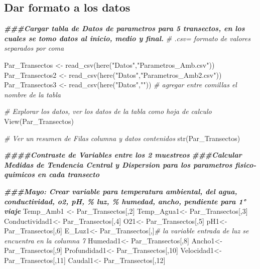 \documentclass[
]{article}
\newenvironment{Shaded}{\begin{snugshade}}{\end{snugshade}}
\newcommand{\CommentTok}[1]{\textcolor[rgb]{0.56,0.35,0.01}{\textit{#1}}}
\newcommand{\DecValTok}[1]{\textcolor[rgb]{0.00,0.00,0.81}{#1}}
\newcommand{\DocumentationTok}[1]{\textcolor[rgb]{0.56,0.35,0.01}{\textbf{\textit{#1}}}}
\newcommand{\FunctionTok}[1]{\textcolor[rgb]{0.00,0.00,0.00}{#1}}
\newcommand{\NormalTok}[1]{#1}
\newcommand{\OtherTok}[1]{\textcolor[rgb]{0.56,0.35,0.01}{#1}}
\newcommand{\StringTok}[1]{\textcolor[rgb]{0.31,0.60,0.02}{#1}}
\begin{document}
\hypertarget{dar-formato-a-los-datos}{%
\subsection{Dar formato a los datos}\label{dar-formato-a-los-datos}}

\begin{Shaded}
\begin{Highlighting}[]
\DocumentationTok{\#\#\#Cargar tabla de Datos de parametros para 5 transectos, en los cuales se tomo datos al inicio, medio y final.  }
\CommentTok{\# .csv= formato de valores separados por coma}

\NormalTok{Par\_Transectos }\OtherTok{\textless{}{-}} \FunctionTok{read\_csv}\NormalTok{(}\FunctionTok{here}\NormalTok{(}\StringTok{"Datos"}\NormalTok{,}\StringTok{"Parametros\_Amb.csv"}\NormalTok{))}
\NormalTok{Par\_Transectos2 }\OtherTok{\textless{}{-}} \FunctionTok{read\_csv}\NormalTok{(}\FunctionTok{here}\NormalTok{(}\StringTok{"Datos"}\NormalTok{,}\StringTok{"Parametros\_Amb2.csv"}\NormalTok{))}
\NormalTok{Par\_Transectos3 }\OtherTok{\textless{}{-}} \FunctionTok{read\_csv}\NormalTok{(}\FunctionTok{here}\NormalTok{(}\StringTok{"Datos"}\NormalTok{,}\StringTok{""}\NormalTok{)) }\CommentTok{\# agregar entre comillas el nombre de la tabla}

\CommentTok{\# Explorar los datos, ver los datos de la tabla como hoja de calculo}
\FunctionTok{View}\NormalTok{(Par\_Transectos)}

\CommentTok{\# Ver un resumen de Filas columna y datos contenidos }
\FunctionTok{str}\NormalTok{(Par\_Transectos)}

\DocumentationTok{\#\#\#\#Contraste de Variables entre los 2 muestreos}
\DocumentationTok{\#\#\#Calcular Medidas de Tendencia Central y Dispersion para los parametros fisico{-}quimicos en cada transecto}

\DocumentationTok{\#\#\#Mayo: Crear variable para temperatura ambiental, del agua, conductividad, o2, pH, \% luz, \% humedad, ancho, pendiente para 1° viaje}
\NormalTok{Temp\_Amb1 }\OtherTok{\textless{}{-}}\NormalTok{ Par\_Transectos[,}\DecValTok{2}\NormalTok{]}
\NormalTok{Temp\_Agua1}\OtherTok{\textless{}{-}}\NormalTok{ Par\_Transectos[,}\DecValTok{3}\NormalTok{]}
\NormalTok{Conductividad1}\OtherTok{\textless{}{-}}\NormalTok{ Par\_Transectos[,}\DecValTok{4}\NormalTok{]}
\NormalTok{O21}\OtherTok{\textless{}{-}}\NormalTok{ Par\_Transectos[,}\DecValTok{5}\NormalTok{]}
\NormalTok{pH1}\OtherTok{\textless{}{-}}\NormalTok{ Par\_Transectos[,}\DecValTok{6}\NormalTok{]}
\NormalTok{E\_Luz1}\OtherTok{\textless{}{-}}\NormalTok{ Par\_Transectos[,]}\CommentTok{\# la variable entrada de luz se encuentra en la columna 7}
\NormalTok{Humedad1}\OtherTok{\textless{}{-}}\NormalTok{ Par\_Transectos[,}\DecValTok{8}\NormalTok{]}
\NormalTok{Ancho1}\OtherTok{\textless{}{-}}\NormalTok{ Par\_Transectos[,}\DecValTok{9}\NormalTok{]}
\NormalTok{Profundidad1}\OtherTok{\textless{}{-}}\NormalTok{ Par\_Transectos[,}\DecValTok{10}\NormalTok{]}
\NormalTok{Velocidad1}\OtherTok{\textless{}{-}}\NormalTok{ Par\_Transectos[,}\DecValTok{11}\NormalTok{]}
\NormalTok{Caudal1}\OtherTok{\textless{}{-}}\NormalTok{ Par\_Transectos[,}\DecValTok{12}\NormalTok{]}


\end{Highlighting}
\end{Shaded}
\end{document}

